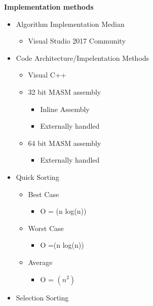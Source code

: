 \documentclass{article}
\begin{document}
\clearpage
\maketitle
\textbf{Implementation methods}
	\begin{itemize}
	\item  Algorithm Implementation Median
		\begin{itemize}
		\item Visual Studio 2017 Community
		\end{itemize}
	\item Code Architecture/Impelentation Methods
		\begin{itemize}
		\item Visual C++
		\item 32 bit MASM assembly 
			\begin{itemize}
			\item Inline Assembly
			\item Externally handled
			\end{itemize}
		\item 64 bit MASM assembly
			\begin{itemize}
			\item Externally handled
			\end{itemize}
		\end{itemize}

	\item Quick Sorting \cite{functions}
			\begin{itemize}
			
			\item Best Case
				\begin{itemize}
				\item O = (n log(n))
				\end{itemize}
			\item Worst Case
				\begin{itemize}
				\item O =(n log(n))
				\end{itemize}
			\item Average
				\begin{itemize}
				 \item O = $(n^2)$ 
				\end{itemize}
		\end{itemize}

	\item Selection Sorting \cite{functions}
			\begin{itemize}
			

\end{itemize}
\end{itemize}
\end{document}
